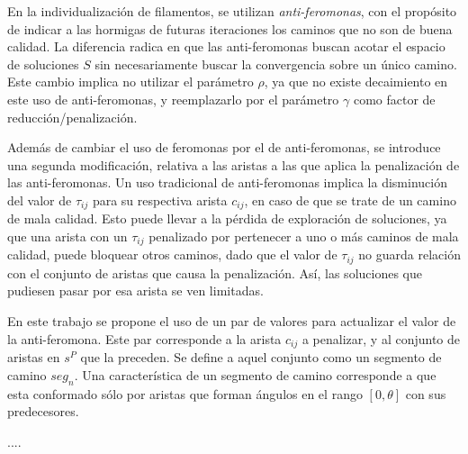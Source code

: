 En la individualizaci\'on de filamentos, se utilizan {\it anti-feromonas}, con el prop\'osito de indicar a las hormigas de futuras iteraciones los caminos que no son de buena calidad. La diferencia radica en que las anti-feromonas buscan acotar el espacio de soluciones $S$ sin necesariamente buscar la convergencia sobre un \'unico camino. Este cambio implica no utilizar el par\'ametro $\rho$, ya que no existe decaimiento en este uso de anti-feromonas, y reemplazarlo por el par\'ametro $\gamma$ como factor de reducci\'on/penalizaci\'on\cite{montgomery2002anti}.


Adem\'as de cambiar el uso de feromonas por el de anti-feromonas, se introduce una segunda modificaci\'on, relativa a las aristas a las que aplica la penalizaci\'on de las anti-feromonas. Un uso tradicional de anti-feromonas implica la disminuci\'on del valor de $\tau_{ij}$ para su respectiva arista $c_{ij}$, en caso de que se trate de un camino de mala calidad. 
Esto puede llevar a la p\'erdida de exploraci\'on de soluciones, ya que una arista con un $\tau_{ij}$ penalizado por pertenecer a uno o m\'as caminos de mala calidad, puede bloquear otros caminos, dado que el valor de $\tau_{ij}$ no guarda relaci\'on con el conjunto de aristas que causa la penalizaci\'on. As\'i, las soluciones que pudiesen pasar por esa arista se ven limitadas.

 

En este trabajo se propone el uso de un par de valores para actualizar el valor de la anti-feromona. Este par corresponde a la arista $c_{ij}$ a penalizar, y al conjunto de aristas en $s^P$ que la preceden. Se define a aquel conjunto como un segmento de camino $seg_n$. Una caracter\'istica de un segmento de camino corresponde a que esta conformado s\'olo por aristas que forman \'angulos en el rango $[0, \theta]$ con sus predecesores.

....

